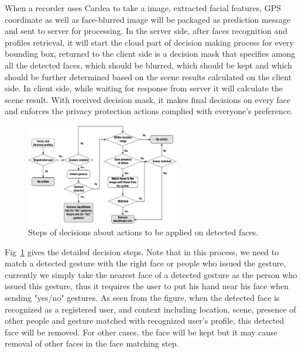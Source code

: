 \begin{description}[leftmargin=0cm]
  \item[{Image capturing:}] When a recorder uses Cardea to take a image, extracted facial features, GPS coordinate as well as face-blurred image will be packaged as prediction message and sent to server for processing. In the server side, after faces recognition and profiles retrieval, it will start the cloud part of decision making process for every bounding box, returned to the client side is a decision mask that specifies among all the detected faces, which should be blurred, which should be kept and which should be further determined based on the scene results calculated on the client side. In client side, while waiting for response from server it will calculate the scene result. With received decision mask, it makes final decisions on every face and enforces the privacy protection actions complied with everyone's preference.

\begin{figure}[!htbp]
    \centering
    \includegraphics[width=0.6\textwidth]{figure/ch4-decisiontree.pdf}
    \caption{Steps of decisions about actions to be applied on detected faces.}
    \label{fig:ch4-decisiontree}
\end{figure}

  \item[{Decision making:}] Fig~\ref{fig:ch4-decisiontree} gives the detailed decision steps. Note that in this process, we need to match a detected gesture with the right face or people who issued the gesture, currently we simply take the nearest face of a detected gesture as the person who issued this gesture, thus it requires the user to put his hand near his face when sending "yes/no" gestures. As seen from the figure, when the detected face is recognized as a registered user, and context including location, scene, presence of other people and gesture matched with recognized user's profile, this detected face will be removed. For other cases, the face will be kept but it may cause removal of other faces in the face matching step.



\end{description}
